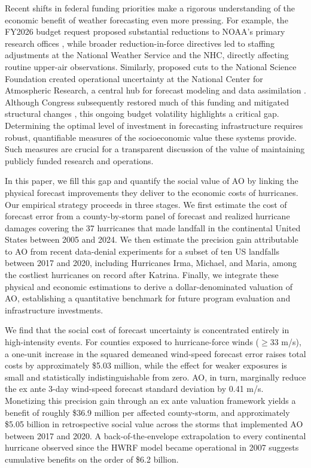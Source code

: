 \documentclass[12pt]{article}%
\begin{document}
Recent shifts in federal funding priorities make a rigorous understanding of the economic benefit of weather forecasting even more pressing. For example, the FY2026 budget request proposed substantial reductions to NOAA's primary research offices \citep{CRS2026NOAABudget}, while broader reduction-in-force directives \citep{EO14210Workforce2025} led to staffing adjustments at the National Weather Service and the NHC, directly affecting routine upper-air observations. Similarly, proposed cuts to the National Science Foundation created operational uncertainty at the National Center for Atmospheric Research, a central hub for forecast modeling and data assimilation \citep{NSF2025BudgetRequest, Science2025NCAR}. Although Congress subsequently restored much of this funding and mitigated structural changes \citep{witze2026world}, this ongoing budget volatility highlights a critical gap. Determining the optimal level of investment in forecasting infrastructure requires robust, quantifiable measures of the socioeconomic value these systems provide. Such measures are crucial for a transparent discussion of the value of maintaining publicly funded research and operations.

In this paper, we fill this gap and quantify the social value of AO by linking the physical forecast improvements they deliver to the economic costs of hurricanes. Our empirical strategy proceeds in three stages. We first estimate the cost of forecast error from a county-by-storm panel of forecast and realized hurricane damages covering the 37 hurricanes that made landfall in the continental United States between 2005 and 2024. We then estimate the precision gain attributable to AO from recent data-denial experiments for a subset of ten US landfalls between 2017 and 2020, including Hurricanes Irma, Michael, and Maria, among the costliest hurricanes on record after Katrina. Finally, we integrate these physical and economic estimations to derive a dollar-denominated valuation of AO, establishing a quantitative benchmark for future program evaluation and infrastructure investments.

We find that the social cost of forecast uncertainty is concentrated entirely in high-intensity events. For counties exposed to hurricane-force winds ($\geq33$ m/s), a one-unit increase in the squared demeaned wind-speed forecast error raises total costs by approximately \$5.03 million, while the effect for weaker exposures is small and statistically indistinguishable from zero. AO, in turn, marginally reduce the ex ante 3-day wind-speed forecast standard deviation by 0.41 m/s. Monetizing this precision gain through an ex ante valuation framework yields a benefit of roughly \$36.9 million per affected county-storm, and approximately \$5.05 billion in retrospective social value across the storms that implemented AO between 2017 and 2020. A back-of-the-envelope extrapolation to every continental hurricane observed since the HWRF model became operational in 2007 \citep{AlakaJr2024} suggests cumulative benefits on the order of \$6.2 billion.
\end{document}
